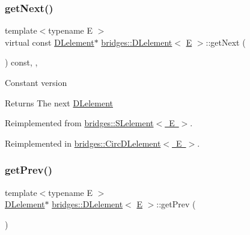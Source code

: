 \mbox{\label{classbridges_1_1_d_lelement_a648012849263b4b1cd2d504d5e5fd880}} 
\subsubsection{\texorpdfstring{getNext()}{getNext()}\hspace{0.1cm}{\footnotesize\ttfamily [2/2]}}
{\footnotesize\ttfamily template$<$typename E $>$ \\
virtual const \mbox{\hyperlink{classbridges_1_1_d_lelement}{D\+Lelement}}$\ast$ \mbox{\hyperlink{classbridges_1_1_d_lelement}{bridges\+::\+D\+Lelement}}$<$ \mbox{\hyperlink{namespacebridges_acfb0a4f7877d8f63de3e6862004c50eda3a3ea00cfc35332cedf6e5e9a32e94da}{E}} $>$\+::get\+Next (\begin{DoxyParamCaption}{ }\end{DoxyParamCaption}) const\hspace{0.3cm}{\ttfamily [inline]}, {\ttfamily [override]}, {\ttfamily [virtual]}}

Constant version

\begin{DoxyReturn}{Returns}
The next \mbox{\hyperlink{classbridges_1_1_d_lelement}{D\+Lelement}} 
\end{DoxyReturn}


Reimplemented from \mbox{\hyperlink{classbridges_1_1_s_lelement_a4422b7731a84734d312b8cd8e241b1e8}{bridges\+::\+S\+Lelement$<$ E $>$}}.



Reimplemented in \mbox{\hyperlink{classbridges_1_1_circ_d_lelement_ac266d60bd2f7ce92cb38a12875a6a468}{bridges\+::\+Circ\+D\+Lelement$<$ E $>$}}.

\mbox{\label{classbridges_1_1_d_lelement_a5b0316fb255d022b0dc3065d681fc2a7}} 
\subsubsection{\texorpdfstring{getPrev()}{getPrev()}\hspace{0.1cm}{\footnotesize\ttfamily [1/2]}}
{\footnotesize\ttfamily template$<$typename E $>$ \\
\mbox{\hyperlink{classbridges_1_1_d_lelement}{D\+Lelement}}$\ast$ \mbox{\hyperlink{classbridges_1_1_d_lelement}{bridges\+::\+D\+Lelement}}$<$ \mbox{\hyperlink{namespacebridges_acfb0a4f7877d8f63de3e6862004c50eda3a3ea00cfc35332cedf6e5e9a32e94da}{E}} $>$\+::get\+Prev (\begin{DoxyParamCaption}{ }\end{DoxyParamCaption})\hspace{0.3cm}{\ttfamily [inline]}}

